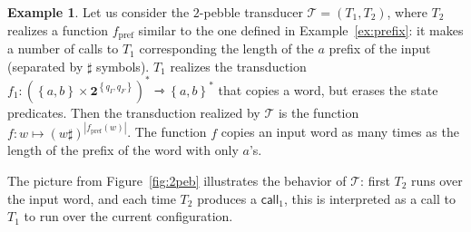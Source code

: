 \documentclass[sigplan,review,anonymous]{acmart}\settopmatter{printfolios=true,printccs=false,printacmref=false}
\newcommand{\set}[1]{\left\{#1 \right\}}
\newcommand{\tuple}[1]{\left(#1 \right)}
\newcommand{\mright}{\rightarrowtriangle}
\newcommand{\Tt}{\mathcal T}
\newcommand{\call}{\mathsf {call}}
\theoremstyle{definition}
\newtheorem{example}[theorem]{Example}
\theoremstyle{remark}
\begin{document}
\begin{example}
Let us consider the $2$-pebble transducer $\Tt=\tuple{T_1,T_2}$, where $T_2$ realizes a function $f_{\mathrm{pref}}$ similar to the one defined in Example~\ref{ex:prefix}: it makes a number of calls to $T_1$ corresponding the length of the $a$ prefix of the input (separated by $\sharp$ symbols). $T_1$ realizes the transduction $f_{1}:(\set{a,b}\times \mathbf 2 ^{\set{q_I,q_F}})^*\mright \set{a,b}^*$ that copies a word, but erases the state predicates.
Then the transduction realized by $\Tt$ is the function $f:w\mapsto (w\sharp)^{|f_{\mathrm{pref}}(w)|}$.
The function $f$ copies an input word as many times as the length of the prefix of the word with only $a$'s.

The picture from Figure~\ref{fig:2peb} illustrates the behavior of $\Tt$: first $T_2$ runs over the input word, and each time $T_2$ produces a $\call_1$, this is interpreted as a call to $T_1$ to run over the current configuration. 

\begin{figure}[h!]

\end{figure}
\end{example}
\end{document}
